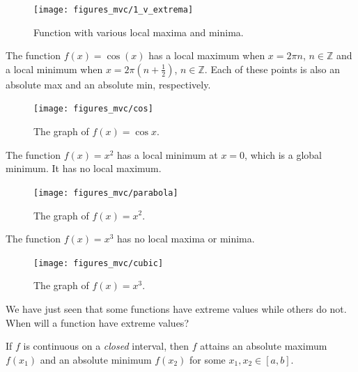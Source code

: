 \documentclass[12pt,letterpaper,reqno]{article}
\numberwithin{equation}{section}
\newcommand{\Z}{\ensuremath{\mathbb Z}}
\begin{document}
{\begin{figure}[h]
	\begin{center}
\texttt{[image: figures\_mvc/1\_v\_extrema]}
\end{center}
\caption{Function with various local maxima and minima.}
\end{figure}

\newpage 

\begin{example}
The function $f(x)=\cos(x)$ has a local maximum when $x=2\pi n$, $n \in \Z$ and a local minimum when $x=2 \pi(n+\frac{1}{2})$, $n \in \Z$. Each of these points is also an absolute max and an absolute min, respectively.

\begin{figure}[h]
	\begin{center}
	\texttt{[image: figures\_mvc/cos]}
\end{center}
\caption{The graph of $f(x)=\cos x$.}
\end{figure}	
\end{example}

\begin{example}
The function $f(x)=x^2$ has a local minimum at $x=0$, which is a global minimum. It has no local maximum.
\begin{figure}[h]
	\begin{center}
	\texttt{[image: figures\_mvc/parabola]}
\end{center}
\caption{The graph of $f(x)=x^2$.}
\end{figure}	
\end{example}

\newpage

\begin{example}
The function $f(x)=x^3$ has no local maxima or minima.
\begin{figure}[h]
	\begin{center}
	\texttt{[image: figures\_mvc/cubic]}
\end{center}
\caption{The graph of $f(x)=x^3$.}
\end{figure}	
\end{example}

We have just seen that some functions have extreme values while others do not. When will a function have extreme values?

\begin{thm}
	If $f$ is continuous on a \emph{closed} interval, then $f$ attains an absolute maximum $f(x_1)$ and an absolute minimum $f(x_2)$ for some $x_1,x_2 \in [a,b]$.	
\end{thm}

}
\end{document}
